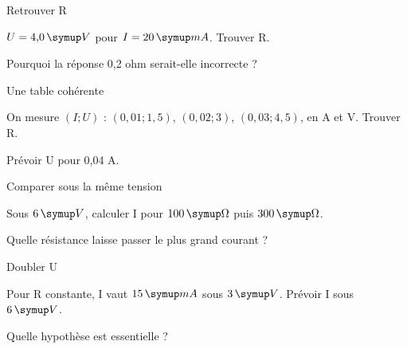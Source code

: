 \par\noindent\begin{minipage}{\linewidth}
\begin{exercice}[2]{Retrouver R}
\begin{questions}
\item $U=4{,}0\unite V$ pour $I=20\unite{mA}$. Trouver R.
\item Pourquoi la réponse 0,2 ohm serait-elle incorrecte ?
\end{questions}
\end{exercice}
\end{minipage}
\par\noindent\begin{minipage}{\linewidth}
\begin{exercice}[2]{Une table cohérente}
\begin{questions}
\item On mesure $(I;U)$ : $(0{,}01;1{,}5)$, $(0{,}02;3)$, $(0{,}03;4{,}5)$, en A et V. Trouver R.
\item Prévoir U pour 0,04 A.
\end{questions}
\end{exercice}
\end{minipage}
\par\noindent\begin{minipage}{\linewidth}
\begin{exercice}[2]{Comparer sous la même tension}
\begin{questions}
\item Sous $6\unite V$, calculer I pour $100\unite\Omega$ puis $300\unite\Omega$.
\item Quelle résistance laisse passer le plus grand courant ?
\end{questions}
\end{exercice}
\end{minipage}
\par\noindent\begin{minipage}{\linewidth}
\begin{exercice}[2]{Doubler U}
\begin{questions}
\item Pour R constante, I vaut $15\unite{mA}$ sous $3\unite V$. Prévoir I sous $6\unite V$.
\item Quelle hypothèse est essentielle ?
\end{questions}
\end{exercice}
\end{minipage}
\clearpage{}
